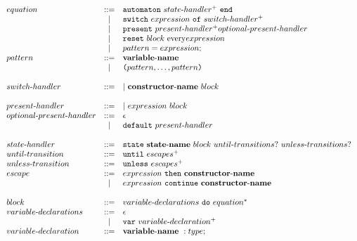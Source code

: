 \documentclass[a4paper]{article}
\newcommand{\Coloneqq}[0]{::=}
\begin{document}
\[
\begin{array}{lcl}
  equation & \Coloneqq &
    \mathtt{automaton} \ state\sdash{}handler^+ \ \mathtt{end} \\
  & | & \mathtt{switch} \ expression \ \mathtt{of} \ switch\sdash{}handler^+ \\
  & | & \mathtt{present} \ present\sdash{}handler^+
    optional\sdash{}present\sdash{}handler \\
  & | & \mathtt{reset} \ block \ \mathrm{every} expression \\
  & | & pattern = expression; \\
  pattern & \Coloneqq & {\bf variable\sdash{}name} \\
  & | & \lp{}pattern,\dots,pattern\rp{} \\

  \\

  switch\sdash{}handler &
    \Coloneqq & | \ {\bf constructor\sdash{}name} \ block \\

  \\

  present\sdash{}handler & \Coloneqq &
    | \ expression \  block \\
  optional\sdash{}present\sdash{}handler & \Coloneqq & \epsilon \\
  & | & \mathtt{default} \ present\sdash{}handler \\

  \\
  state\sdash{}handler & \Coloneqq &
    \mathtt{state} \  {\bf state\sdash{}name} \ block
    \ until\sdash{}transitions? \  unless\sdash{}transitions? \\
  until\sdash{}transition & \Coloneqq & \mathtt{until} \ escapes^+ \\
  unless\sdash{}transition & \Coloneqq & \mathtt{unless} \ escapes^+ \\
  escape & \Coloneqq &
    expression \ \mathtt{then} \ {\bf constructor\sdash{}name} \\
    & | & expression \ \mathtt{continue} \ {\bf constructor\sdash{}name} \\

  \\

  block & \Coloneqq & variable\sdash{}declarations \ \mathtt{do} \ equation^* \\
  variable\sdash{}declarations & \Coloneqq & \epsilon \\
  & | & \mathtt{var} \ variable\sdash{}declaration^+ \\
  variable\sdash{}declaration & \Coloneqq & {\bf variable\sdash{}name} \ : type;
    \\


\end{array}\]
\end{document}
